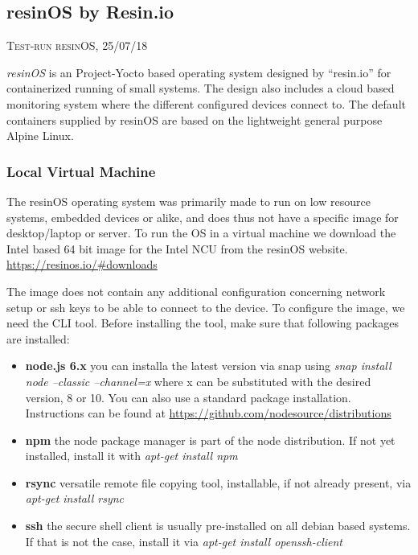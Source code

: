 \documentclass[]{scrartcl}
\begin{document}
\subsection{resinOS by Resin.io}

{\small\textsc{Test-run resinOS, 25/07/18} \bigskip}

\textit{resinOS} is an Project-Yocto based operating system designed by ``resin.io'' for containerized running of small systems. The design also includes a cloud based monitoring system where the different configured devices connect to. The default containers supplied by resinOS are based on the lightweight general purpose Alpine Linux.

\subsubsection{Local Virtual Machine}

The resinOS operating system was primarily made to run on low resource systems, embedded devices or alike, and does thus not have a specific image for desktop/laptop or server. To run the OS in a virtual machine we download the Intel based 64 bit image for the Intel NCU from the resinOS website. \url{https://resinos.io/#downloads}

The image does not contain any additional configuration concerning network setup or ssh keys to be able to connect to the device. To configure the image, we need the CLI tool. Before installing the tool, make sure that following packages are installed:

\begin{itemize}
	
	\item \textbf{node.js 6.x} you can installa the latest version via snap using \textit{snap install node --classic --channel=x} where x can be substituted with the desired version, 8 or 10. You can also use a standard package installation. Instructions can be found at \url{https://github.com/nodesource/distributions}
	\item \textbf{npm} the node package manager is part of the node distribution. If not yet installed, install it with \textit{apt-get install npm}
	\item \textbf{rsync} versatile remote file copying tool, installable, if not already present, via \textit{apt-get install rsync}
	\item \textbf{ssh} the secure shell client is usually pre-installed on all debian based systems. If that is not the case, install it via \textit{apt-get install openssh-client}
	
\end{itemize}
\end{document}
